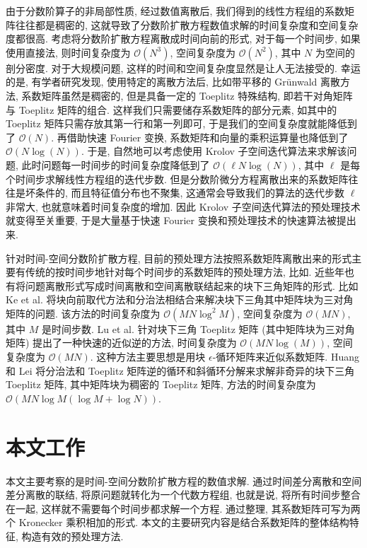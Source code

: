 \documentclass{ecnumaster}
\begin{document}
由于分数阶算子的非局部性质, 经过数值离散后, 我们得到的线性方程组的系数矩阵往往都是稠密的,
这就导致了分数阶扩散方程数值求解的时间复杂度和空间复杂度都很高.
考虑将分数阶扩散方程离散成时间向前的形式, 对于每一个时间步, 如果使用直接法,
则时间复杂度为 $\mathcal{O}(N^3)$, 空间复杂度为 $\mathcal{O}(N^2)$,
其中 $N$ 为空间的剖分密度.
对于大规模问题, 这样的时间和空间复杂度显然是让人无法接受的.
幸运的是, 有学者研究发现, 使用特定的离散方法后, 比如带平移的 Gr\"unwald 离散方法\cite{WW11},
系数矩阵虽然是稠密的, 但是具备一定的 Toeplitz 特殊结构\cite{WWS10},
即若干对角矩阵与 Toeplitz 矩阵的组合.
这样我们只需要储存系数矩阵的部分元素, 如其中的 Toeplitz 矩阵只需存放其第一行和第一列即可,
于是我们的空间复杂度就能降低到了 $\mathcal{O}(N)$.
再借助快速 Fourier 变换, 系数矩阵和向量的乘积运算量也降低到了 $\mathcal{O}(N\log (N))$.
于是, 自然地可以考虑使用 Krolov 子空间迭代算法来求解该问题,
此时问题每一时间步的时间复杂度降低到了 $\mathcal{O}(\ell N\log (N))$,
其中 $\ell$ 是每个时间步求解线性方程组的迭代步数.
但是分数阶微分方程离散出来的系数矩阵往往是坏条件的,
而且特征值分布也不聚集, 这通常会导致我们的算法的迭代步数 $\ell$ 非常大,
也就意味着时间复杂度的增加.
因此 Krolov 子空间迭代算法的预处理技术就变得至关重要,
于是大量基于快速 Fourier 变换和预处理技术的快速算法被提出来\cite{BLP17, DMS16, JLZ15, LS13, LYJ14, PKNS14, PS12, SYM15, WWS10, WD13, WW11}.

针对时间-空间分数阶扩散方程,
目前的预处理方法按照系数矩阵离散出来的形式主要有传统的按时间步地针对每个时间步的系数矩阵的预处理方法,
比如\cite{GHJCA17, LGHFZ18, LS13, PS12, GHZLL15, WWS10, ZZL18}.
%
近些年也有将问题离散形式写成时间离散和空间离散联结起来的块下三角矩阵的形式.
比如 Ke et al.\cite{KNS15} 将块向前取代方法和分治法相结合来解决块下三角其中矩阵块为三对角矩阵的问题.
该方法的时间复杂度为 $\mathcal{O}(MN\log^2M)$, 空间复杂度为 $\mathcal{O}(MN)$, 其中 $M$ 是时间步数.
Lu et al.\cite{LPS15} 针对块下三角 Toeplitz 矩阵
(其中矩阵块为三对角矩阵) 提出了一种快速的近似逆的方法,
时间复杂度为 $\mathcal{O}(MN\log(M))$, 空间复杂度为 $\mathcal{O}(MN)$.
这种方法主要思想是用块 $\epsilon$-循环矩阵来近似系数矩阵.
Huang 和 Lei \cite{HL17} 将分治法和 Toeplitz 矩阵逆的循环和斜循环分解来求解非奇异的块下三角 Toeplitz 矩阵,
其中矩阵块为稠密的 Toeplitz 矩阵, 方法的时间复杂度为 $\mathcal{O}(MN\log M(\log M + \log N))$.



\section{本文工作}
本文主要考察的是时间-空间分数阶扩散方程的数值求解.
通过时间差分离散和空间差分离散的联结, 将原问题就转化为一个代数方程组,
也就是说, 将所有时间步整合在一起, 这样就不需要每个时间步都求解一个方程.
%
通过整理, 其系数矩阵可写为两个 Kronecker 乘积相加的形式.
本文的主要研究内容是结合系数矩阵的整体结构特征, 构造有效的预处理方法.
\end{document}

